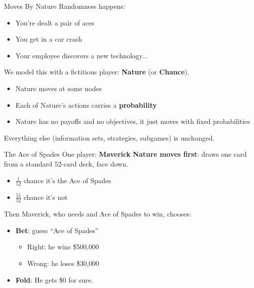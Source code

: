 \begin{frame}{Moves By Nature}
Randomness happens:
\begin{itemize}
    \item You're dealt a pair of aces
    \item You get in a car crash
    \item Your employee discovers a new technology...
\end{itemize}
\bsk
We model this with a fictitious player: \textbf{Nature} (or \textbf{Chance}).
\bsk
\begin{itemize}
    \item Nature moves at some nodes
    \item Each of Nature's actions carries a \textbf{probability}
    \item Nature has no payoffs and no objectives, it just moves with fixed probabilities
\end{itemize}
\vfill
Everything else (information sets, strategies, subgames) is unchanged.
\vspace{-0.4in}
\end{frame}

\begin{frame}{The Ace of Spades}
One player: \textbf{Maverick}
\bsk
\textbf{Nature moves first}: draws one card from a standard 52-card deck, face down.
\begin{itemize}
    \item $\frac{1}{52}$ chance it's the Ace of Spades
    \item $\frac{51}{52}$ chance it's not
\end{itemize}
\bsk
Then Maverick, who needs and Ace of Spades to win, chooses:
\begin{itemize}
    \item \textbf{Bet}: guess ``Ace of Spades''
    \begin{itemize}
        \item Right: he wins \$500{,}000
        \item Wrong: he loses \$30{,}000
    \end{itemize}
    \item \textbf{Fold}: He gets \$0 for sure.
\end{itemize}
\vfill
\vspace{-0.3in}
\end{frame}

